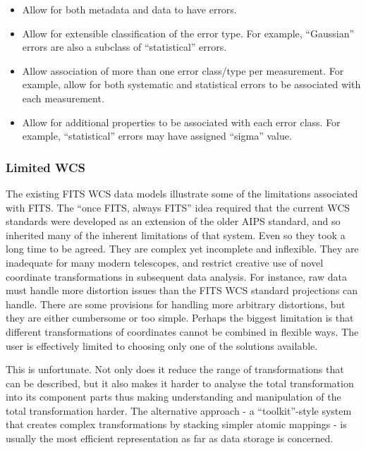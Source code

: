 \documentclass[final,authoryear,5p,times,twocolumn]{elsarticle}
\begin{document}
\begin{itemize}
\item Allow for both metadata and data to have errors.

\item Allow for extensible classification of the error type. For example,
``Gaussian'' errors are also a subclass of ``statistical'' errors.

\item Allow association of more than one error class/type per
measurement. For example, allow for both systematic and statistical
errors to be associated with each measurement.

\item Allow for additional properties to be associated with each error
class. For example, ``statistical'' errors may have assigned ``sigma''
value.
\end{itemize}

\subsubsection{Limited WCS\label{sec:wcs}}


The existing FITS WCS data models illustrate some of the limitations
associated with FITS. The ``once FITS, always FITS'' idea required that
the current WCS standards were developed as an extension of the older
AIPS standard, and so inherited many of the inherent limitations of
that system. Even so they took a long time to be agreed. They are
complex yet incomplete and inflexible. They are inadequate for many
modern telescopes, and restrict creative use of novel coordinate
transformations in subsequent data analysis. For instance, raw data
must handle more distortion issues than the FITS WCS standard
projections can handle. There are some provisions for handling more
arbitrary distortions, but they are either cumbersome or too
simple. Perhaps the biggest limitation is that different
transformations of coordinates cannot be combined in flexible
ways. The user is effectively limited to choosing only one of the solutions
available.


This is unfortunate. Not only does it reduce the range of
transformations that can be described, but it also makes it harder to
analyse the total transformation into its component parts thus making
understanding and manipulation of the total transformation harder. The
alternative approach - a ``toolkit''-style system that creates complex
transformations by stacking simpler atomic mappings - is usually the
most efficient representation as far as data storage is concerned.
\end{document}
